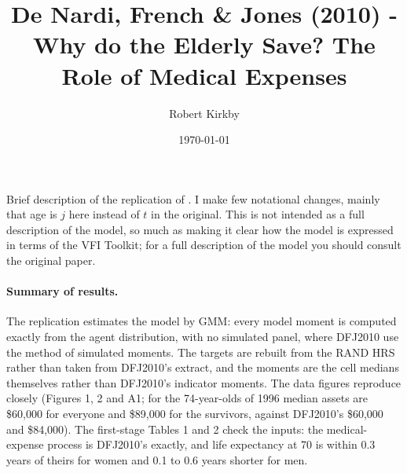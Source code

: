 \documentclass[11pt,fleqn]{article}
\begin{document}
\newcommand{\rob}[1]{{\noindent\color{blue}\bf #1}}
\newcommand{\robc}[1]{{\noindent\color{blue}\bf R: #1}}

\title{De Nardi, French \& Jones (2010) - Why do the Elderly Save? The Role of Medical Expenses}
\author{Robert Kirkby} 
\date{\today}
\maketitle
Brief description of the replication of \cite*{DeNardiFrenchJones2010}. I make few notational changes, mainly that age is $j$ here instead of $t$ in the original. This is not intended as a full description of the model, so much as making it clear how the model is expressed in terms of the VFI Toolkit; for a full description of the model you should consult the original paper.

\paragraph{Summary of results.} The replication estimates the model by GMM: every model moment is computed exactly from the agent distribution, with no simulated panel, where DFJ2010 use the method of simulated moments. The targets are rebuilt from the RAND HRS rather than taken from DFJ2010's extract, and the moments are the cell medians themselves rather than DFJ2010's indicator moments. The data figures reproduce closely (Figures 1, 2 and A1; for the 74-year-olds of 1996 median assets are \$60,000 for everyone and \$89,000 for the survivors, against DFJ2010's \$60,000 and \$84,000). The first-stage Tables 1 and 2 check the inputs: the medical-expense process is DFJ2010's exactly, and life expectancy at 70 is within 0.3 years of theirs for women and 0.1 to 0.6 years shorter for men.
\end{document}
